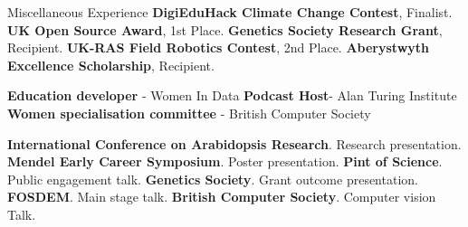 \begin{rubric}{Miscellaneous Experience}
\entry*[2022] \textbf{DigiEduHack Climate Change Contest}, Finalist.
\entry*[2019] \textbf{UK Open Source Award}, 1st Place.
\entry*[2017] \textbf{Genetics Society Research Grant}, Recipient.
\entry*[2016] \textbf{UK-RAS Field Robotics Contest}, 2nd Place.
\entry*[2014] \textbf{Aberystwyth Excellence Scholarship}, Recipient.

\entry*[2022] \textbf{Education developer} - Women In Data
\entry*[2022] \textbf{Podcast Host}- Alan Turing Institute
\entry*[2022] \textbf{Women specialisation committee} - British Computer Society

\entry*[2022] \textbf{International Conference on Arabidopsis Research}.
Research presentation.
\entry*[2022] \textbf{Mendel Early Career Symposium}.
Poster presentation.
\entry*[2022] \textbf{Pint of Science}.
Public engagement talk.
\entry*[2018] \textbf{Genetics Society}. Grant outcome presentation.
\entry*[2017] \textbf{FOSDEM}. Main stage talk.
\entry*[2017] \textbf{British Computer Society}. Computer vision Talk.



\end{rubric}